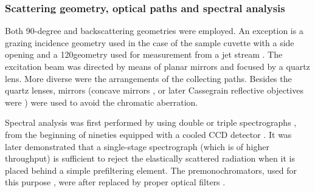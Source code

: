 \subsubsection{Scattering geometry, optical paths and spectral analysis}

Both 90-degree and backscattering geometries were employed. An exception is a
grazing incidence geometry used in the case of the sample cuvette with a side
opening
\parencite{Jolles1984}
and a 120\textdegree geometry used for measurement from a jet stream
\parencite{Fodor1985}.
The excitation beam was directed by means of planar mirrors and focused by a
quartz lens.
More diverse were the arrangements of the collecting paths.
Besides the quartz lenses, mirrors (concave mirrors
\cite{Blazej1977},
or later Cassegrain reflective objectives were
\cite{%
	Toyama1991,%
	Russell1995%
})
were used to avoid the chromatic aberration.

Spectral analysis was first performed by using double or triple spectrographs
\parencite{%
	Harada1975,%
	Gfrorer1993a,%
	Toyama1993%
},
from the beginning of nineties equipped with a cooled CCD detector
\parencite{%
	Gfrorer1993a,%
	Toyama1993%
}.
It was later demonstrated that a single-stage spectrograph (which is of higher
throughput) is sufficient to reject the elastically scattered radiation when it
is placed behind a simple prefiltering element.
The premonochromators, used for this purpose
\parencite{%
	Hashimoto1993,%
	Russell1995%
},
were after replaced by proper optical filters
\parencite{%
	Munro1997,%
	Bykov2013%
}.
